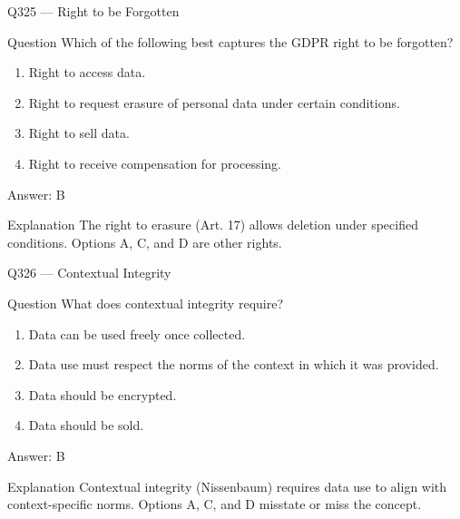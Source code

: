 \documentclass[aspectratio=169,8pt]{beamer}
\begin{document}
\begin{frame}{Q325 --- Right to be Forgotten}
	\begin{block}{Question}
		Which of the following best captures the GDPR right to be forgotten?
		\begin{enumerate}
			\item Right to access data.
			\item Right to request erasure of personal data under certain conditions.
			\item Right to sell data.
			\item Right to receive compensation for processing.
	\end{enumerate}  \end{block}
	\begin{exampleblock}{Answer: B}\end{exampleblock}
	\begin{block}{Explanation}
		The right to erasure (Art. 17) allows deletion under specified conditions. Options A, C, and D are other rights.
	\end{block}
\end{frame}

\begin{frame}{Q326 --- Contextual Integrity}
	\begin{block}{Question}
		What does contextual integrity require?
		\begin{enumerate}
			\item Data can be used freely once collected.
			\item Data use must respect the norms of the context in which it was provided.
			\item Data should be encrypted.
			\item Data should be sold.
	\end{enumerate}  \end{block}
	\begin{exampleblock}{Answer: B}\end{exampleblock}
	\begin{block}{Explanation}
		Contextual integrity (Nissenbaum) requires data use to align with context-specific norms. Options A, C, and D misstate or miss the concept.
	\end{block}
\end{frame}
\end{document}
